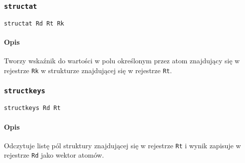 \subsubsection{\texttt{structat}}

\begin{lstlisting}
structat Rd Rt Rk
\end{lstlisting}

\paragraph*{Opis} Tworzy wskaźnik do wartości w polu określonym przez atom
znajdujący się w rejestrze \texttt{Rk} w strukturze znajdującej się w rejestrze
\texttt{Rt}.

\subsubsection{\texttt{structkeys}}

\begin{lstlisting}
structkeys Rd Rt
\end{lstlisting}

\paragraph*{Opis} Odczytuje listę pól struktury znajdującej się w rejestrze
\texttt{Rt} i wynik zapisuje w rejestrze \texttt{Rd} jako wektor atomów.
